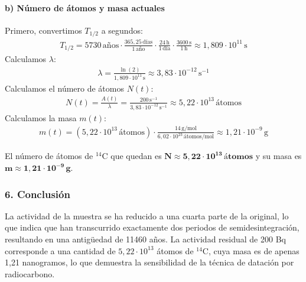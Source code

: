 \paragraph{b) Número de átomos y masa actuales}
Primero, convertimos $T_{1/2}$ a segundos:
\begin{gather}
    T_{1/2} = 5730 \, \text{años} \cdot \frac{365,25 \, \text{días}}{1 \, \text{año}} \cdot \frac{24 \, \text{h}}{1 \, \text{día}} \cdot \frac{3600 \, \text{s}}{1 \, \text{h}} \approx 1,809 \cdot 10^{11} \, \text{s}
\end{gather}
Calculamos $\lambda$:
\begin{gather}
    \lambda = \frac{\ln(2)}{1,809 \cdot 10^{11} \, \text{s}} \approx 3,83 \cdot 10^{-12} \, \text{s}^{-1}
\end{gather}
Calculamos el número de átomos $N(t)$:
\begin{gather}
    N(t) = \frac{A(t)}{\lambda} = \frac{200 \, \text{s}^{-1}}{3,83 \cdot 10^{-12} \, \text{s}^{-1}} \approx 5,22 \cdot 10^{13} \, \text{átomos}
\end{gather}
Calculamos la masa $m(t)$:
\begin{gather}
    m(t) = (5,22 \cdot 10^{13} \, \text{átomos}) \cdot \frac{14 \, \text{g/mol}}{6,02 \cdot 10^{23} \, \text{átomos/mol}} \approx 1,21 \cdot 10^{-9} \, \text{g}
\end{gather}
\begin{cajaresultado}
    El número de átomos de $^{14}\text{C}$ que quedan es $\boldsymbol{N \approx 5,22 \cdot 10^{13} \, \textbf{átomos}}$ y su masa es $\boldsymbol{m \approx 1,21 \cdot 10^{-9} \, \textbf{g}}$.
\end{cajaresultado}

\subsubsection*{6. Conclusión}
\begin{cajaconclusion}
La actividad de la muestra se ha reducido a una cuarta parte de la original, lo que indica que han transcurrido exactamente dos periodos de semidesintegración, resultando en una antigüedad de 11460 años. La actividad residual de 200 Bq corresponde a una cantidad de $5,22 \cdot 10^{13}$ átomos de $^{14}\text{C}$, cuya masa es de apenas 1,21 nanogramos, lo que demuestra la sensibilidad de la técnica de datación por radiocarbono.
\end{cajaconclusion}

\newpage
